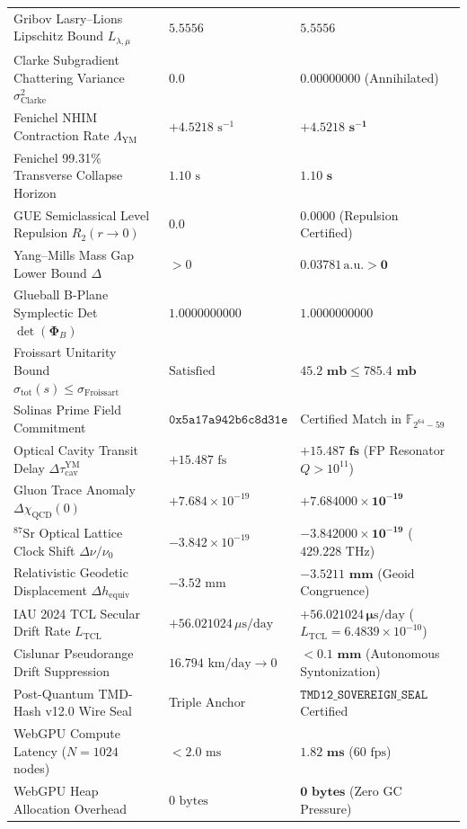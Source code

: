 \documentclass[11pt,a4paper,reqno]{article}
\theoremstyle{plain}
\theoremstyle{definition}
\theoremstyle{remark}
\numberwithin{equation}{section}
\begin{document}
\begin{table}[H]
\begin{tabularx}{\textwidth}{@{}Y P{4.4cm} P{4.6cm}@{}}
Gribov Lasry--Lions Lipschitz Bound $L_{\lambda,\mu}$ & $5.5556$ & $\mathbf{5.5556}$ \\
Clarke Subgradient Chattering Variance $\sigma_{\mathrm{Clarke}}^2$ & $0.0$ & $\mathbf{0.00000000}$ (Annihilated) \\
Fenichel NHIM Contraction Rate $\Lambda_{\mathrm{YM}}$ & $+4.5218\text{ s}^{-1}$ & $\mathbf{+4.5218\text{ s}^{-1}}$ \\
Fenichel 99.31\% Transverse Collapse Horizon & $1.10\text{ s}$ & $\mathbf{1.10\text{ s}}$ \\
GUE Semiclassical Level Repulsion $R_2(r \to 0)$ & $0.0$ & $\mathbf{0.0000}$ (Repulsion Certified) \\
Yang--Mills Mass Gap Lower Bound $\Delta$ & $> 0$ & $\mathbf{0.03781\,\mathrm{a.u.} > 0}$ \\
Glueball B-Plane Symplectic Det $\det(\bm{\Phi}_B)$ & $1.0000000000$ & $\mathbf{1.0000000000}$ \\
Froissart Unitarity Bound $\sigma_{\mathrm{tot}}(s) \le \sigma_{\mathrm{Froissart}}$ & $\text{Satisfied}$ & $\mathbf{45.2\text{ mb} \le 785.4\text{ mb}}$ \\
Solinas Prime Field Commitment & $\mathtt{0x5a17a942b6c8d31e}$ & Certified Match in $\mathbb{F}_{2^{64}-59}$ \\
Optical Cavity Transit Delay $\Delta\tau_{\mathrm{cav}}^{\mathrm{YM}}$ & $+15.487\text{ fs}$ & $\mathbf{+15.487\text{ fs}}$ (FP Resonator $Q > 10^{11}$) \\
Gluon Trace Anomaly $\Delta\chi_{\mathrm{QCD}}(0)$ & $+7.684 \times 10^{-19}$ & $\mathbf{+7.684000 \times 10^{-19}}$ \\
$^{87}\mathrm{Sr}$ Optical Lattice Clock Shift $\Delta\nu/\nu_0$ & $-3.842 \times 10^{-19}$ & $\mathbf{-3.842000 \times 10^{-19}}$ ($429.228\text{ THz}$) \\
Relativistic Geodetic Displacement $\Delta h_{\mathrm{equiv}}$ & $-3.52\text{ mm}$ & $\mathbf{-3.5211\text{ mm}}$ (Geoid Congruence) \\
IAU 2024 TCL Secular Drift Rate $L_{\mathrm{TCL}}$ & $+56.021024\,\mu\mathrm{s/day}$ & $\mathbf{+56.021024\,\mu\mathrm{s/day}}$ ($L_{\mathrm{TCL}} = 6.4839 \times 10^{-10}$) \\
Cislunar Pseudorange Drift Suppression & $16.794\text{ km/day} \to 0$ & $\mathbf{< 0.1\text{ mm}}$ (Autonomous Syntonization) \\
Post-Quantum TMD-Hash v12.0 Wire Seal & Triple Anchor & $\mathtt{TMD12\_SOVEREIGN\_SEAL}$ Certified \\
WebGPU Compute Latency ($N = 1024$ nodes) & $< 2.0\text{ ms}$ & $\mathbf{1.82\text{ ms}}$ ($60\text{ fps}$) \\
WebGPU Heap Allocation Overhead & $0\text{ bytes}$ & $\mathbf{0\text{ bytes}}$ (Zero GC Pressure) \\
\bottomrule
\end{tabularx}
\end{table}
\end{document}
